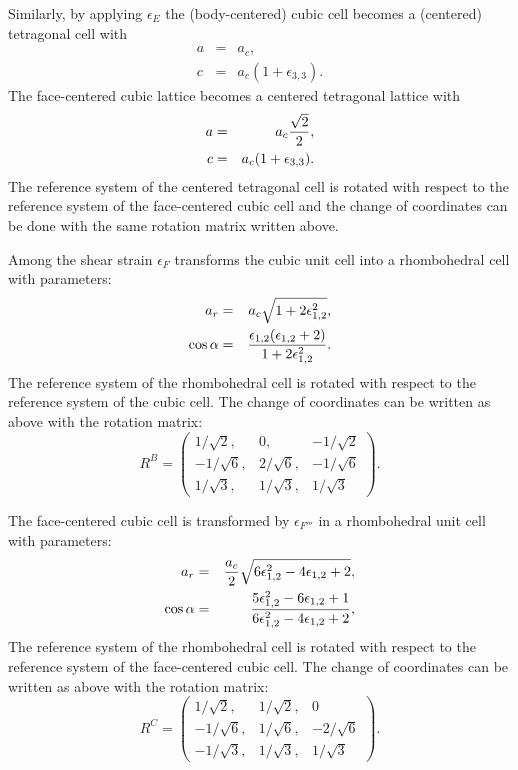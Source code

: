 \documentclass[12pt,a4paper,twoside]{report}
\begin{document}
Similarly, by applying $\epsilon_E$ the (body-centered) cubic
cell becomes a (centered) tetragonal cell with
\begin{eqnarray}
a&=&a_c,   \\
c&=&a_c (1+\epsilon_{3,3}).
\end{eqnarray}
The face-centered cubic lattice becomes a centered tetragonal lattice with
\begin{eqnarray}
a&=&a_c {\sqrt{2}\over 2},   \\
c&=&a_c (1+\epsilon_{3,3}).
\end{eqnarray}
The reference system of the centered tetragonal
cell is rotated with respect to the reference system of the face-centered
cubic cell and the change of coordinates can be done with the same rotation 
matrix written above.

Among the shear strain $\epsilon_F$
transforms the cubic unit cell into a rhombohedral cell with
parameters:
\begin{eqnarray}
a_r&=& a_c \sqrt{1+2\epsilon_{1,2}^2}, \\
\cos\alpha &=& {\epsilon_{1,2} (\epsilon_{1,2} + 2) \over 
1 + 2 \epsilon_{1,2}^2 }.
\end{eqnarray}
The reference system of the rhombohedral cell is rotated with respect to
the reference system of the cubic cell. The change of coordinates can
be written as above with the rotation matrix:
\begin{equation}
R^B=\left( \begin{array}{ccc}
1/\sqrt{2}, & 0, & -1/\sqrt{2}
\\
-1/\sqrt{6}, & 2/\sqrt{6}, & -1/\sqrt{6}
\\
1/\sqrt{3}, & 1/\sqrt{3}, & 1/\sqrt{3}
\end{array}
\right).
\end{equation}

The face-centered cubic cell is transformed by $\epsilon_{F'''}$
in a rhombohedral unit cell with parameters:
\begin{eqnarray}
a_r&=& {a_c \over 2} \sqrt{6 \epsilon_{1,2}^2-4 \epsilon_{1,2} +2}, \\
\cos\alpha &=& {5\epsilon_{1,2}^2- 6\epsilon_{1,2} + 1 \over 
6\epsilon_{1,2}^2 - 4\epsilon_{1,2}+2 },
\end{eqnarray}
The reference system of the rhombohedral cell is rotated with respect to
the reference system of the face-centered cubic cell. 
The change of coordinates can be written as above with the rotation matrix:
\begin{equation}
R^C=\left( \begin{array}{ccc}
1/\sqrt{2}, & 1/\sqrt{2}, & 0 \\
-1/\sqrt{6}, & 1/\sqrt{6}, & -2/\sqrt{6}
\\
-1/\sqrt{3}, & 1/\sqrt{3}, & 1/\sqrt{3}
\end{array}
\right).
\end{equation}
\end{document}
